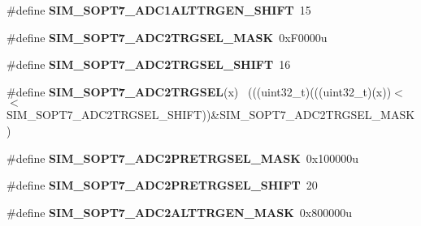 \begin{DoxyCompactItemize}
\item 
\hypertarget{group___s_i_m___register___masks_gab364156b2cb9b83329803bdc8c0c589e}{}\#define {\bfseries S\+I\+M\+\_\+\+S\+O\+P\+T7\+\_\+\+A\+D\+C1\+A\+L\+T\+T\+R\+G\+E\+N\+\_\+\+S\+H\+I\+F\+T}~15\label{group___s_i_m___register___masks_gab364156b2cb9b83329803bdc8c0c589e}

\item 
\hypertarget{group___s_i_m___register___masks_gaf5aa79d769a8fb0bbee667ca0bc51f37}{}\#define {\bfseries S\+I\+M\+\_\+\+S\+O\+P\+T7\+\_\+\+A\+D\+C2\+T\+R\+G\+S\+E\+L\+\_\+\+M\+A\+S\+K}~0x\+F0000u\label{group___s_i_m___register___masks_gaf5aa79d769a8fb0bbee667ca0bc51f37}

\item 
\hypertarget{group___s_i_m___register___masks_ga0ca3b9a09479b220e222441376394095}{}\#define {\bfseries S\+I\+M\+\_\+\+S\+O\+P\+T7\+\_\+\+A\+D\+C2\+T\+R\+G\+S\+E\+L\+\_\+\+S\+H\+I\+F\+T}~16\label{group___s_i_m___register___masks_ga0ca3b9a09479b220e222441376394095}

\item 
\hypertarget{group___s_i_m___register___masks_ga5a5ffdff412372ea1b9eb8339af4d3d2}{}\#define {\bfseries S\+I\+M\+\_\+\+S\+O\+P\+T7\+\_\+\+A\+D\+C2\+T\+R\+G\+S\+E\+L}(x)                                ~(((uint32\+\_\+t)(((uint32\+\_\+t)(x))$<$$<$S\+I\+M\+\_\+\+S\+O\+P\+T7\+\_\+\+A\+D\+C2\+T\+R\+G\+S\+E\+L\+\_\+\+S\+H\+I\+F\+T))\&S\+I\+M\+\_\+\+S\+O\+P\+T7\+\_\+\+A\+D\+C2\+T\+R\+G\+S\+E\+L\+\_\+\+M\+A\+S\+K)\label{group___s_i_m___register___masks_ga5a5ffdff412372ea1b9eb8339af4d3d2}

\item 
\hypertarget{group___s_i_m___register___masks_ga5da3c6fca63f77898a34a598827be594}{}\#define {\bfseries S\+I\+M\+\_\+\+S\+O\+P\+T7\+\_\+\+A\+D\+C2\+P\+R\+E\+T\+R\+G\+S\+E\+L\+\_\+\+M\+A\+S\+K}~0x100000u\label{group___s_i_m___register___masks_ga5da3c6fca63f77898a34a598827be594}

\item 
\hypertarget{group___s_i_m___register___masks_ga687e85053a66da187466610629d216e8}{}\#define {\bfseries S\+I\+M\+\_\+\+S\+O\+P\+T7\+\_\+\+A\+D\+C2\+P\+R\+E\+T\+R\+G\+S\+E\+L\+\_\+\+S\+H\+I\+F\+T}~20\label{group___s_i_m___register___masks_ga687e85053a66da187466610629d216e8}

\item 
\hypertarget{group___s_i_m___register___masks_gab1d2eb52d5a1e6b9192840c990b3aa1c}{}\#define {\bfseries S\+I\+M\+\_\+\+S\+O\+P\+T7\+\_\+\+A\+D\+C2\+A\+L\+T\+T\+R\+G\+E\+N\+\_\+\+M\+A\+S\+K}~0x800000u\label{group___s_i_m___register___masks_gab1d2eb52d5a1e6b9192840c990b3aa1c}


\end{DoxyCompactItemize}
